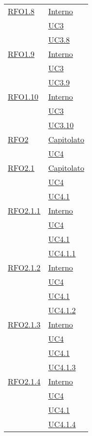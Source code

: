 \begin{longtable}{|>{\centering}m{5cm}|m{5cm}<{\centering}|}
\hyperlink{RFO1.8}{RFO1.8} 
& \hyperlink{Interno}{Interno}\\
& \hyperref[UC3]{UC3}\\
& \hyperref[UC3.8]{UC3.8}\\ \hline

\hyperlink{RFO1.9}{RFO1.9} 
& \hyperlink{Interno}{Interno}\\
& \hyperref[UC3]{UC3}\\
& \hyperref[UC3.9]{UC3.9}\\ \hline

\hyperlink{RFO1.10}{RFO1.10} 
& \hyperlink{Interno}{Interno}\\
& \hyperref[UC3]{UC3}\\
& \hyperref[UC3.10]{UC3.10}\\ \hline

\hyperlink{RFO2}{RFO2} 
& \hyperlink{Capitolato}{Capitolato}\\
& \hyperref[UC4]{UC4}\\ \hline

\hyperlink{RFO2.1}{RFO2.1} 
& \hyperlink{Capitolato}{Capitolato}\\
& \hyperref[UC4]{UC4}\\
& \hyperref[UC4.1]{UC4.1}\\ \hline

\hyperlink{RFO2.1.1}{RFO2.1.1} 
& \hyperlink{Interno}{Interno}\\
& \hyperref[UC4]{UC4}\\
& \hyperref[UC4.1]{UC4.1}\\
& \hyperref[UC4.1.1]{UC4.1.1}\\ \hline

\hyperlink{RFO2.1.2}{RFO2.1.2} 
& \hyperlink{Interno}{Interno}\\
& \hyperref[UC4]{UC4}\\
& \hyperref[UC4.1]{UC4.1}\\
& \hyperref[UC4.1.2]{UC4.1.2}\\ \hline

\hyperlink{RFO2.1.3}{RFO2.1.3} 
& \hyperlink{Interno}{Interno}\\
& \hyperref[UC4]{UC4}\\
& \hyperref[UC4.1]{UC4.1}\\
& \hyperref[UC4.1.3]{UC4.1.3}\\ \hline

\hyperlink{RFF2.1.4}{RFO2.1.4} 
& \hyperlink{Interno}{Interno}\\
& \hyperref[UC4]{UC4}\\
& \hyperref[UC4.1]{UC4.1}\\
& \hyperref[UC4.1.4]{UC4.1.4}\\ \hline


\end{longtable}
